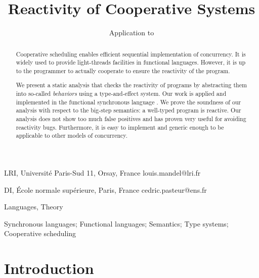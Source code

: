 \documentclass[9pt,preprint]{sigplanconf}
\begin{document}
\newtheorem{theorem}{Theorem}
\newtheorem{property}[theorem]{Property}
\newtheorem{lemma}[theorem]{Lemma}
\newtheorem{hypothesis}[theorem]{Hypothesis}

\theoremstyle{definition}
\newtheorem{definition}{Definition}

\title{Reactivity of Cooperative Systems}
\subtitle{Application to \rml}

{LRI, Universit\'e Paris-Sud 11, Orsay, France}
{louis.mandel@lri.fr}

{DI, \'Ecole normale sup\'erieure, Paris, France}
{cedric.pasteur@ens.fr}

\maketitle

\begin{abstract}
Cooperative scheduling enables efficient sequential implementation of concurrency. It is widely used to provide light-threads facilities in functional languages. However, it is up to the programmer to actually cooperate to ensure the reactivity of the program. 

We present a static analysis that checks the reactivity of programs by abstracting them into so-called \emph{behaviors} using a type-and-effect system. Our work is applied and implemented in the functional synchronous language \rml. We prove the soundness of our analysis with respect to the big-step semantics: a well-typed program is reactive. Our analysis does not show too much false positives and has proven very useful for avoiding reactivity bugs. Furthermore, it is easy to implement and generic enough to be applicable to other models of concurrency.
\end{abstract}


\terms
Languages, Theory

\keywords
Synchronous languages; Functional languages;  Semantics; Type systems; Cooperative scheduling

\section{Introduction}
\label{sec:introduction}
\end{document}
